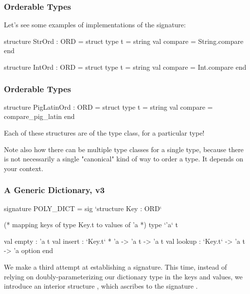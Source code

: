 \documentclass[aspectratio=169]{beamer}
\begin{document}
\begin{frame}[fragile]
  \frametitle{Orderable Types}

  Let's see some examples of implementations of the  signature:

  \pause
  \begin{codeblock}
    structure StrOrd : ORD =
      struct
        type t = string
        val compare = String.compare
      end

    structure IntOrd : ORD =
      struct
        type t = string
        val compare = Int.compare
      end
  \end{codeblock}
\end{frame}

\begin{frame}[fragile]
  \frametitle{Orderable Types}

  \begin{codeblock}
    structure PigLatinOrd : ORD =
      struct
        type t = string
        val compare = compare_pig_latin
      end
  \end{codeblock}

  \pause
  \vspace{\fill}

  Each of these structures are  of the  type class,
  for a particular type!

  \pause
  \vspace{\fill}


  \pause
  \vspace{\fill}

  Note also how there can be multiple type classes for a single type, because there
  is not necessarily a single "canonical" kind of way to order a type. It depends
  on your context.
\end{frame}

\begin{frame}[fragile]
  \frametitle{A Generic Dictionary, v3}

  {\small
  \begin{codeblock}
    signature POLY_DICT =
      sig
        `structure Key : ORD`

        (* mapping keys of type Key.t to values of 'a *)
        type `'a` t

        val empty : 'a t
        val insert : `Key.t` * 'a -> 'a t -> 'a t
        val lookup : `Key.t` -> 'a t -> 'a option
      end
  \end{codeblock}
  }

  \pause
  \vspace{\fill}

  We make a third attempt at establishing a  signature.
  This time, instead of relying on doubly-parameterizing our dictionary
  type in the keys and values, we introduce an interior structure
  , which ascribes to the signature .
\end{frame}
\end{document}
